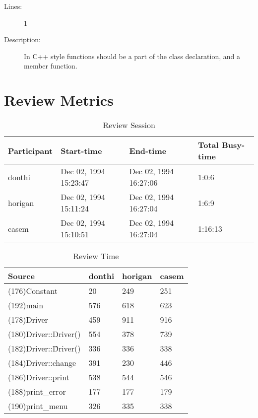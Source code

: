 \begin{enumerate}
\begin{description}
\item [Lines:] 1

\item [Description:] In C++ style functions should be a part of
the class declaration, and a member function.
\end{description}
\end{enumerate}
\section{Review Metrics}
\begin{table}[hb]
\begin{center}
\begin{tabular}{|l|l|l|l|}
\hline
Participant & Start-time & End-time & Total Busy-time \\
\hline
donthi & Dec 02, 1994 15:23:47 & Dec 02, 1994 16:27:06 & 1:0:6 \\
horigan & Dec 02, 1994 15:11:24 & Dec 02, 1994 16:27:04 & 1:6:9 \\
casem & Dec 02, 1994 15:10:51 & Dec 02, 1994 16:27:04 & 1:16:13 \\
\hline
\end{tabular}
\end{center}
\caption{Review Session}
\end{table}


\begin{table}[hb]
\begin{center}
\begin{tabular}{|l|l|l|l|}
\hline
Source & donthi & horigan & casem\\
\hline
(176)Constant & 20 & 249 & 251\\
(192)main & 576 & 618 & 623\\
(178)Driver & 459 & 911 & 916\\
(180)Driver::Driver() & 554 & 378 & 739\\
(182)Driver::\~Driver() & 336 & 336 & 338\\
(184)Driver::change & 391 & 230 & 446\\
(186)Driver::print & 538 & 544 & 546\\
(188)print\_error & 177 & 177 & 179\\
(190)print\_menu & 326 & 335 & 338\\
\hline
\end{tabular}
\end{center}
\caption{Review Time}
\end{table}



